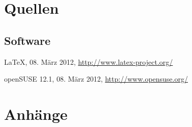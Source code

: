 \documentclass[12pt,        %
  english,ngerman,          %
  paper=a4,                 %
  captions=tablesignature,  %
  listof=numbered,          %
  bibliography=totoc,       %
  headings=small,           %
  headinclude=false,        %
  footinclude=false,        %
  parskip=half-,            %
  oneside,                  %
  DIV=12                    %
  ]{styles/colidok}
\begin{document}
  \cleardoublepage
  \lstlistoflistings  %

\chapter{Quellen}


\renewcommand{\bibname}{Literatur}



{}


\section*{Software}

\LaTeX, 08. März 2012, \url{http://www.latex-project.org/}

openSUSE 12.1, 08. März 2012, \url{http://www.opensuse.org/}

\renewcommand{\thechapter}{\Alph{chapter}}
\renewcommand{\thesection}{\Alph{section}}
\renewcommand{\thesubsection}{\Alph{section}.\arabic{subsection}}
\setcounter{section}{0} %
\addtocounter{chapter}{1} %

\chapter{Anhänge}\label{chapter:appendix}
\end{document}

